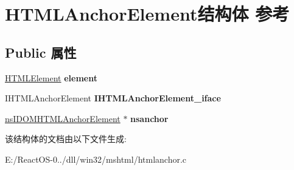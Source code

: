 \hypertarget{struct_h_t_m_l_anchor_element}{}\section{H\+T\+M\+L\+Anchor\+Element结构体 参考}
\label{struct_h_t_m_l_anchor_element}
\subsection*{Public 属性}
\begin{DoxyCompactItemize}
\item 
\mbox{\label{struct_h_t_m_l_anchor_element_ab6af3cfa9338603999a35d1fb4bda6db}} 
\hyperlink{struct_h_t_m_l_element}{H\+T\+M\+L\+Element} {\bfseries element}
\item 
\mbox{\label{struct_h_t_m_l_anchor_element_addae6cc47537f8700402b25b3c737d93}} 
I\+H\+T\+M\+L\+Anchor\+Element {\bfseries I\+H\+T\+M\+L\+Anchor\+Element\+\_\+iface}
\item 
\mbox{\label{struct_h_t_m_l_anchor_element_a70e04153376d4a7c4618a56dc05415b9}} 
\hyperlink{interfacens_i_d_o_m_h_t_m_l_anchor_element}{ns\+I\+D\+O\+M\+H\+T\+M\+L\+Anchor\+Element} $\ast$ {\bfseries nsanchor}
\end{DoxyCompactItemize}


该结构体的文档由以下文件生成\+:\begin{DoxyCompactItemize}
\item 
E\+:/\+React\+O\+S-\/0../dll/win32/mshtml/htmlanchor.\+c\end{DoxyCompactItemize}
